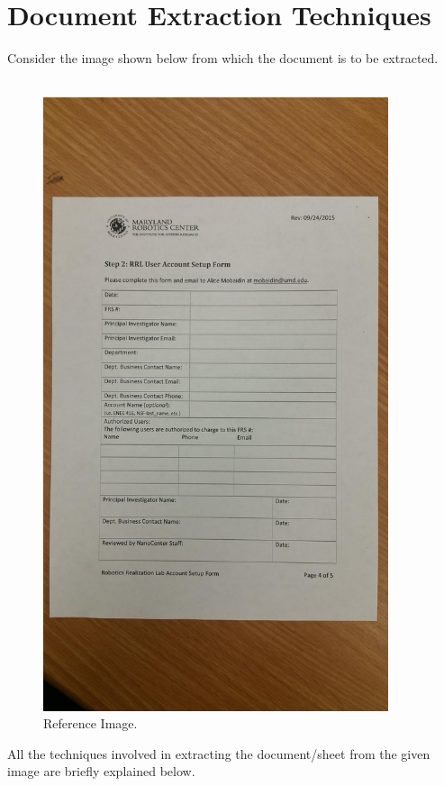 
\section{Document Extraction Techniques}

Consider the image shown below from which the document is to be extracted. 
\\ \\

\begin{figure}[th]
	\centering
	\includegraphics[height=18cm ]{Figures/resized_input}
	\caption[Reference Image]{Reference Image.}
	\label{fig:ReferenceImage}
\end{figure}

\pagebreak
All the techniques involved in extracting the document/sheet from the given image are briefly explained below. \\

